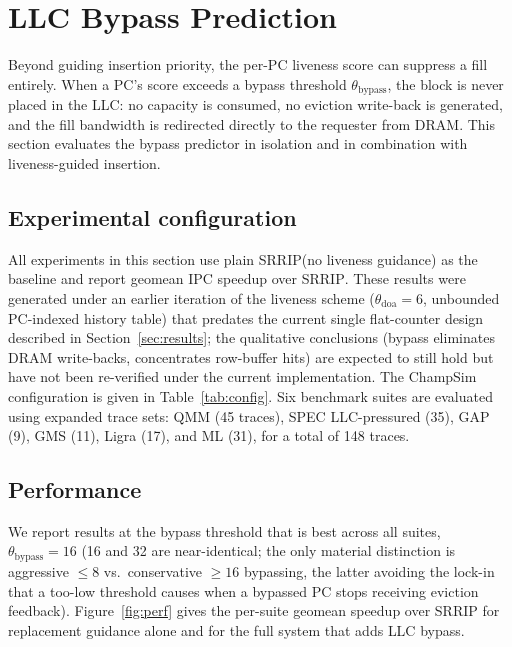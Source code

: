 \documentclass[conference]{IEEEtran}
\newcommand{\srrip}{\textsc{SRRIP}\xspace}
\newcommand{\llc}{\textsc{LLC}\xspace}
\begin{document}
\section{LLC Bypass Prediction}
\label{sec:bypass}

Beyond guiding insertion priority, the per-PC liveness score can suppress a
fill entirely. When a PC's score exceeds a bypass threshold
$\theta_{\mathrm{bypass}}$, the block is never placed in the \llc: no capacity
is consumed, no eviction write-back is generated, and the fill bandwidth is
redirected directly to the requester from DRAM. This section evaluates the
bypass predictor in isolation and in combination with liveness-guided insertion.

\subsection{Experimental configuration}
\label{sec:bypass_setup}

All experiments in this section use plain \srrip (no liveness guidance) as the
baseline and report geomean IPC speedup over \srrip. These results were
generated under an earlier iteration of the liveness scheme
($\theta_{\mathrm{doa}} = 6$, unbounded PC-indexed history table) that
predates the current single flat-counter design described in
Section~\ref{sec:results}; the qualitative conclusions (bypass eliminates
DRAM write-backs, concentrates row-buffer hits) are expected to still hold
but have not been re-verified under the current implementation.
The ChampSim~\cite{champsim} configuration is given in Table~\ref{tab:config}. Six benchmark suites are
evaluated using expanded trace sets: QMM (45 traces), SPEC LLC-pressured (35),
GAP (9), GMS (11), Ligra (17), and ML (31), for a total of 148 traces.

\subsection{Performance}
\label{sec:perf}

We report results at the bypass threshold that is best across all suites,
$\theta_{\mathrm{bypass}}=16$ (16 and 32 are near-identical; the only material
distinction is aggressive ${\leq}8$ vs.\ conservative ${\geq}16$ bypassing, the
latter avoiding the lock-in that a too-low threshold causes when a bypassed PC
stops receiving eviction feedback). Figure~\ref{fig:perf} gives the per-suite
geomean speedup over \srrip for replacement guidance alone and for the full system
that adds \llc bypass.
\end{document}

